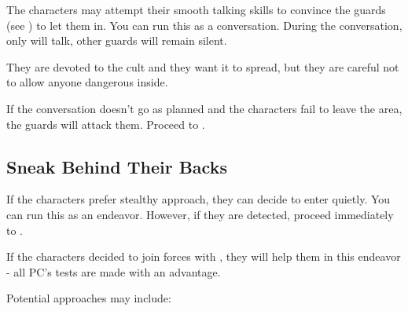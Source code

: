 The characters may attempt their smooth talking skills to convince the guards (see ) to let them in. You can run this as a conversation. During the conversation, only \enemyRevelerMasked{} will talk, other guards will remain silent.

They are devoted to the cult and they want it to spread, but they are careful not to allow anyone dangerous inside.


If the conversation doesn't go as planned and the characters fail to leave the area, the guards will attack them. Proceed to .




\subsection{Sneak Behind Their Backs}
\label{ssec:cityEscapePlanSneak}

If the characters prefer stealthy approach, they can decide to enter quietly. You can run this as an endeavor. However, if they are detected, proceed immediately to .

If the characters decided to join forces with \npcFractionCrime{}, they will help them in this endeavor - all PC's tests are made with an advantage.

Potential approaches may include:






